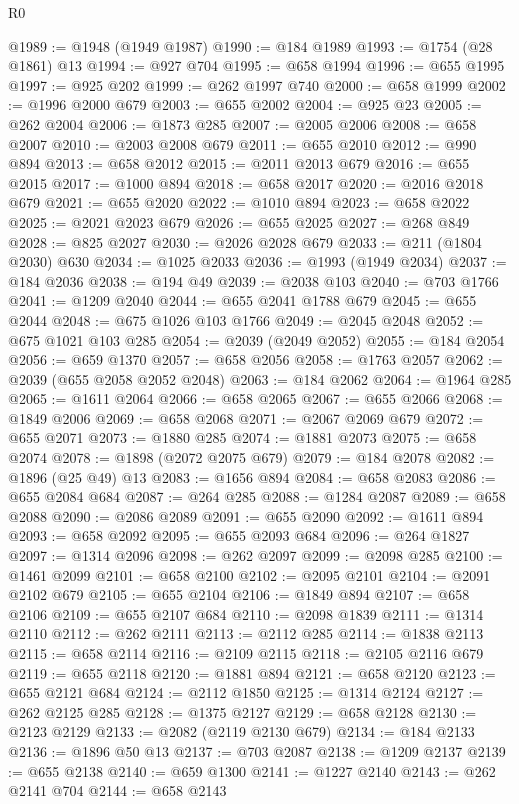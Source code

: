 \begin{lexlean}{R0}
\begin{coremodule}
@1989 := @1948 (@1949 @1987)
@1990 := @184 @1989
@1993 := @1754 (@28 @1861) @13
@1994 := @927 @704
@1995 := @658 @1994
@1996 := @655 @1995
@1997 := @925 @202
@1999 := @262 @1997 @740
@2000 := @658 @1999
@2002 := @1996 @2000 @679
@2003 := @655 @2002
@2004 := @925 @23
@2005 := @262 @2004
@2006 := @1873 @285
@2007 := @2005 @2006
@2008 := @658 @2007
@2010 := @2003 @2008 @679
@2011 := @655 @2010
@2012 := @990 @894
@2013 := @658 @2012
@2015 := @2011 @2013 @679
@2016 := @655 @2015
@2017 := @1000 @894
@2018 := @658 @2017
@2020 := @2016 @2018 @679
@2021 := @655 @2020
@2022 := @1010 @894
@2023 := @658 @2022
@2025 := @2021 @2023 @679
@2026 := @655 @2025
@2027 := @268 @849
@2028 := @825 @2027
@2030 := @2026 @2028 @679
@2033 := @211 (@1804 @2030) @630
@2034 := @1025 @2033
@2036 := @1993 (@1949 @2034)
@2037 := @184 @2036
@2038 := @194 @49
@2039 := @2038 @103
@2040 := @703 @1766
@2041 := @1209 @2040
@2044 := @655 @2041 @1788 @679
@2045 := @655 @2044
@2048 := @675 @1026 @103 @1766
@2049 := @2045 @2048
@2052 := @675 @1021 @103 @285
@2054 := @2039 (@2049 @2052)
@2055 := @184 @2054
@2056 := @659 @1370
@2057 := @658 @2056
@2058 := @1763 @2057
@2062 := @2039 (@655 @2058 @2052 @2048)
@2063 := @184 @2062
@2064 := @1964 @285
@2065 := @1611 @2064
@2066 := @658 @2065
@2067 := @655 @2066
@2068 := @1849 @2006
@2069 := @658 @2068
@2071 := @2067 @2069 @679
@2072 := @655 @2071
@2073 := @1880 @285
@2074 := @1881 @2073
@2075 := @658 @2074
@2078 := @1898 (@2072 @2075 @679)
@2079 := @184 @2078
@2082 := @1896 (@25 @49) @13
@2083 := @1656 @894
@2084 := @658 @2083
@2086 := @655 @2084 @684
@2087 := @264 @285
@2088 := @1284 @2087
@2089 := @658 @2088
@2090 := @2086 @2089
@2091 := @655 @2090
@2092 := @1611 @894
@2093 := @658 @2092
@2095 := @655 @2093 @684
@2096 := @264 @1827
@2097 := @1314 @2096
@2098 := @262 @2097
@2099 := @2098 @285
@2100 := @1461 @2099
@2101 := @658 @2100
@2102 := @2095 @2101
@2104 := @2091 @2102 @679
@2105 := @655 @2104
@2106 := @1849 @894
@2107 := @658 @2106
@2109 := @655 @2107 @684
@2110 := @2098 @1839
@2111 := @1314 @2110
@2112 := @262 @2111
@2113 := @2112 @285
@2114 := @1838 @2113
@2115 := @658 @2114
@2116 := @2109 @2115
@2118 := @2105 @2116 @679
@2119 := @655 @2118
@2120 := @1881 @894
@2121 := @658 @2120
@2123 := @655 @2121 @684
@2124 := @2112 @1850
@2125 := @1314 @2124
@2127 := @262 @2125 @285
@2128 := @1375 @2127
@2129 := @658 @2128
@2130 := @2123 @2129
@2133 := @2082 (@2119 @2130 @679)
@2134 := @184 @2133
@2136 := @1896 @50 @13
@2137 := @703 @2087
@2138 := @1209 @2137
@2139 := @655 @2138
@2140 := @659 @1300
@2141 := @1227 @2140
@2143 := @262 @2141 @704
@2144 := @658 @2143

\end{coremodule}
\end{lexlean}

